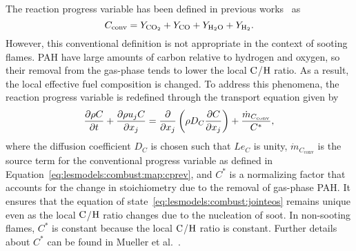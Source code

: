The reaction progress variable has been defined in previous works~\cite{pierce2004,ihme2008} as
\begin{equation}\label{eq:lesmodels:combust:map:cprev}
  C_{\text{conv}} = Y_{\ce{CO2}} + Y_{\ce{CO}} + Y_{\ce{H2O}} + Y_{\ce{H2}}.
\end{equation}
However, this conventional definition is not appropriate in the context of sooting flames. PAH have large amounts of carbon relative to hydrogen and oxygen, so their removal from the gas-phase tends to lower the local $\ce{C}$/$\ce{H}$ ratio. As a result, the local effective fuel composition is changed. To address this phenomena, the reaction progress variable is redefined through the transport equation given by
\begin{equation}\label{eq:lesmodels:combust:map:c}
  \trder{C} = \pder[]{x_j}\left( \rho D_C \pder[C]{x_j} \right) + \frac{\dot{m}_{C_{\text{conv}}}}{C^*},
\end{equation}
where the diffusion coefficient $D_C$ is chosen such that $Le_C$ is unity, $\dot{m}_{C_{\text{conv}}}$ is the source term for the conventional progress variable as defined in Equation~\ref{eq:lesmodels:combust:map:cprev}, and $C^*$ is a normalizing factor that accounts for the change in stoichiometry due to the removal of gas-phase PAH. It ensures that the equation of state~\ref{eq:lesmodels:combust:jointeos} remains unique even as the local $\ce{C}$/$\ce{H}$ ratio changes due to the nucleation of soot. In non-sooting flames, $C^*$ is constant because the local $\ce{C}$/$\ce{H}$ ratio is constant. Further details about $C^*$ can be found in Mueller et al.~\cite{mueller2012}.

